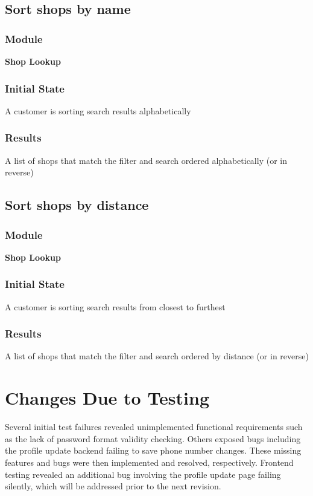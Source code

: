 \documentclass[12pt, titlepage]{article}
\begin{document}
\subsection{Sort shops by name}
    \subsubsection{Module}
    \textbf{Shop Lookup}
    \subsubsection{Initial State}
    A customer is sorting search results alphabetically 
    \subsubsection{Results}
    A list of shops that match the filter and search ordered alphabetically (or in reverse)

\subsection{Sort shops by distance}
    \subsubsection{Module}
    \textbf{Shop Lookup}
    \subsubsection{Initial State}
    A customer is sorting search results from closest to furthest
    \subsubsection{Results}
    A list of shops that match the filter and search ordered by distance (or in reverse)


\section{Changes Due to Testing}

Several initial test failures revealed unimplemented functional requirements such as the lack of password format validity checking. Others exposed bugs including the profile update backend failing to save phone number changes. These missing features and bugs were then implemented and resolved, respectively. Frontend testing revealed an additional bug involving the profile update page failing silently, which will be addressed prior to the next revision.
\end{document}
